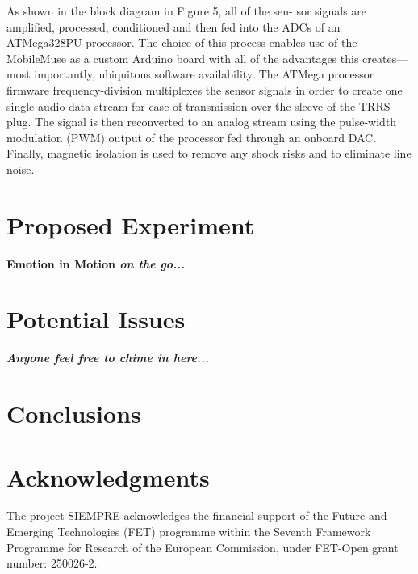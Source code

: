 \documentclass{sig-alternate}
\begin{document}
As shown in the block diagram in Figure 5, all of the sen- sor signals are amplified, processed, conditioned and then fed into the ADCs of an ATMega328PU processor. The choice of this process enables use of the MobileMuse as a custom Arduino board with all of the advantages this creates---most importantly, ubiquitous software availability. The ATMega processor firmware frequency-division multiplexes the sensor signals in order to create one single audio data stream for ease of transmission over the sleeve of the TRRS plug. The signal is then reconverted to an analog stream using the pulse-width modulation (PWM) output of the processor fed through an onboard DAC. Finally, magnetic isolation is used to remove any shock risks and to eliminate line noise.

\section{Proposed Experiment}
\vspace{12pt}
\textbf{Emotion in Motion \textit{on the go...}}
\vspace{12pt}

\section{Potential Issues}
\vspace{12pt}
\textbf{\textit{Anyone feel free to chime in here...}}
\vspace{12pt}

\section{Conclusions}


\section{Acknowledgments}
The project SIEMPRE acknowledges the financial support of the Future and Emerging Technologies (FET) programme within the Seventh Framework Programme for Research of the European Commission, under FET-Open grant number: 250026-2.

%


%
%
\end{document}
